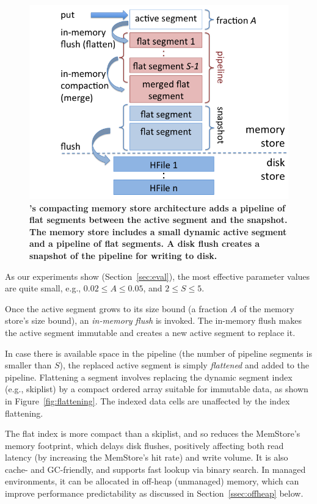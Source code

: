 \begin{figure}[tb]
\center
\includegraphics[width=\columnwidth]{accordion-arch} 
\caption{\textbf{\sys's compacting memory store architecture adds a pipeline of flat segments between the active segment and the snapshot. 
The memory store includes a small dynamic active segment 
and a pipeline of flat segments. A disk flush creates a snapshot of the pipeline for writing to disk.}}
\label{fig:accordion}
\end{figure}

\noindent
As our experiments show (Section~\ref{sec:eval}), the most effective parameter values are quite small, 
e.g., $0.02 \leq A \leq 0.05$, and $2 \leq S \leq 5$.

Once the active segment grows to its size bound (a fraction $A$ of the memory store's size bound), an \emph{in-memory flush} is invoked.
The in-memory flush makes the active segment immutable and creates a new active segment to replace it. 

In case there is available space in the pipeline (the number of pipeline segments is smaller than $S$), the replaced active segment is simply \emph{flattened}  and 
added to the pipeline. Flattening a segment involves replacing the dynamic segment index (e.g., skiplist) by a compact ordered array suitable for immutable data, as shown in Figure~\ref{fig:flattening}.
The indexed data cells are unaffected by the index flattening.

The flat index is more compact than a skiplist, and so reduces the MemStore's memory footprint, which delays  disk flushes, positively affecting both read latency  (by increasing the MemStore's hit rate) and write volume.
It is also cache- and GC-friendly,  and supports fast lookup via binary search. 
In managed environments, it can be allocated in off-heap (unmanaged) memory, which can improve performance predictability as  discussed in Section~\ref{ssec:offheap} below.

